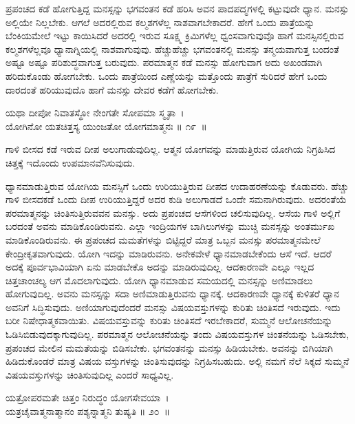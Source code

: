 ಪ್ರಪಂಚದ ಕಡೆ ಹೋಗುತ್ತಿದ್ದ ಮನಸ್ಸನ್ನು ಭಗವಂತನ ಕಡೆ ಹರಿಸಿ ಅವನ ಪಾದಪದ್ಮಗಳಲ್ಲಿ ಕಟ್ಟುವುದೇ ಧ್ಯಾನ. ಮನಸ್ಸು ಅಲ್ಲಿಯೇ ನಿಲ್ಲಬೇಕು. ಆಗಲೆ ಅದರಲ್ಲಿರುವ ಕಲ್ಮಶಗಳೆಲ್ಲ ನಾಶವಾಗಬೇಕಾದರೆ. ಹೇಗೆ ಒಂದು ಪಾತ್ರೆಯನ್ನು ಬೆಂಕಿಯಮೇಲೆ ಇಟ್ಟು ಕಾಯಿಸಿದರೆ ಅದರಲ್ಲಿ ಇರುವ ಸೂಕ್ಷ್ಮ ಕ್ರಿಮಿಗಳೆಲ್ಲ ಧ್ವಂಸವಾಗುವುವೊ ಹಾಗೆ ಮನಸ್ಸಿನಲ್ಲಿರುವ ಕಲ್ಮಶಗಳೆಲ್ಲವೂ ಧ್ಯಾನಾಗ್ನಿಯಲ್ಲಿ ನಾಶವಾಗುವುವು. ಹೆಚ್ಚುಹೆಚ್ಚು ಭಗವಂತನಲ್ಲಿ ಮನಸ್ಸು ತನ್ಮಯವಾಗುತ್ತ ಬಂದಂತೆ ಅಷ್ಟೂ ಅಷ್ಟೂ ಪರಿಶುದ್ಧವಾಗುತ್ತ ಬರುವುದು. ಪರಮಾತ್ಮನ ಕಡೆ ಮನಸ್ಸು ಹೋಗುವಾಗ ಅದು ಅಖಂಡವಾಗಿ ಹರಿದುಕೊಂಡು ಹೋಗಬೇಕು. ಒಂದು ಪಾತ್ರೆಯಿಂದ ಎಣ್ಣೆಯನ್ನು ಮತ್ತೊಂದು ಪಾತ್ರೆಗೆ ಸುರಿದರೆ ಹೇಗೆ ಒಂದು ದಾರದಂತೆ ಹರಿಯುವುದೊ ಹಾಗೆ ಮನಸ್ಸು ದೇವರ ಕಡೆಗೆ ಹೋಗಬೇಕು.

\begin{shloka}
ಯಥಾ ದೀಪೋ ನಿವಾತಸ್ಥೋ ನೇಂಗತೇ ಸೋಪಮಾ ಸ್ಮೃತಾ~।\\ಯೋಗಿನೋ ಯತಚಿತ್ತಸ್ಯ ಯುಂಜತೋ ಯೋಗಮಾತ್ಮನಃ \hfill॥ ೧೯~॥
\end{shloka}

\begin{artha}
ಗಾಳಿ ಬೀಸದ ಕಡೆ ಇರುವ ದೀಪ ಅಲುಗಾಡುವುದಿಲ್ಲ. ಆತ್ಮನ ಯೋಗವನ್ನು ಮಾಡುತ್ತಿರುವ ಯೋಗಿಯ ನಿಗ್ರಹಿಸಿದ ಚಿತ್ತಕ್ಕೆ ಇದೊಂದು ಉಪಮಾನವೆನಿಸುವುದು.
\end{artha}

ಧ್ಯಾನಮಾಡುತ್ತಿರುವ ಯೋಗಿಯ ಮನಸ್ಸಿಗೆ ಒಂದು ಉರಿಯುತ್ತಿರುವ ದೀಪದ ಉದಾಹರಣೆಯನ್ನು ಕೊಡುವರು. ಹೆಚ್ಚು ಗಾಳಿ ಬೀಸದಕಡೆ ಒಂದು ದೀಪ ಉರಿಯುತ್ತಿದ್ದರೆ ಅದರ ಕುಡಿ ಅಲುಗಾಡದೆ ಒಂದೇ ಸಮನಾಗಿರುವುದು. ಅದರಂತೆಯೆ ಪರಮಾತ್ಮನನ್ನು ಚಿಂತಿಸುತ್ತಿರುವವನ ಮನಸ್ಸು. ಅದು ಪ್ರಪಂಚದ ಆಸೆಗಳಿಂದ ಚಲಿಸುವುದಿಲ್ಲ. ಆಸೆಯ ಗಾಳಿ ಅಲ್ಲಿಗೆ ಬರದಂತೆ ಅವನು ಮಾಡಿಕೊಂಡಿರುವನು. ಎಲ್ಲಾ ಇಂದ್ರಿಯಗಳ ಬಾಗಿಲುಗಳನ್ನು ಮುಚ್ಚಿ ಮನಸ್ಸನ್ನು ಅಂತರ್ಮುಖ ಮಾಡಿಕೊಂಡಿರುವನು. ಈ ಪ್ರಪಂಚದ ಮಮತೆಗಳನ್ನು ಬಿಟ್ಟಿದ್ದರೆ ಮಾತ್ರ ಒಬ್ಬನ ಮನಸ್ಸು ಪರಮಾತ್ಮನಮೇಲೆ ಕೇಂದ್ರೀಕೃತವಾಗುವುದು. ಯೋಗಿ ಇದನ್ನು ಮಾಡಿರುವನು. ಅನೇಕವೇಳೆ ಧ್ಯಾನಮಾಡಬೇಕೆಂದು ಆಸೆ ಇದೆ. ಆದರೆ ಅದಕ್ಕೆ ಪೂರ್ವಭಾವಿಯಾಗಿ ಏನು ಮಾಡಬೇಕೊ ಅದನ್ನು ಮಾಡಿರುವುದಿಲ್ಲ. ಆದಕಾರಣವೇ ಎಲ್ಲೂ ಇಲ್ಲದ ಚಿತ್ತಚಾಂಚಲ್ಯ ಆಗ ಮೊದಲಾಗುವುದು. ಯೋಗಿ ಧ್ಯಾನಮಾಡುವ ಸಮಯದಲ್ಲಿ ಮನಸ್ಸನ್ನು ಅಣಿಮಾಡಲು ಹೋಗುವುದಿಲ್ಲ. ಅವನು ಮನಸ್ಸನ್ನು ಸದಾ ಅಣಿಮಾಡುತ್ತಿರುವನು ಧ್ಯಾನಕ್ಕೆ. ಆದಕಾರಣವೇ ಧ್ಯಾನಕ್ಕೆ ಕುಳಿತರೆ ಧ್ಯಾನ ಅವನಿಗೆ ಸಿದ್ಧಿಸುವುದು. ಅಣಿಯಾಗುವುದೆಂದರೆ ಮನಸ್ಸು ವಿಷಯವಸ್ತುಗಳನ್ನು ಕುರಿತು ಚಿಂತಿಸದೆ ಇರುವುದು. ಇದು ಬರೀ ನಿಷೇಧಾತ್ಮಕವಾಯಿತು. ವಿಷಯವಸ್ತುವನ್ನು ಕುರಿತು ಚಿಂತಿಸದೆ ಇರಬೇಕಾದರೆ, ಸುಮ್ಮನೆ ಆಲೋಚನೆಯನ್ನು ಓಡಿಸಿಬಿಡುವುದಕ್ಕಾಗುವುದಿಲ್ಲ. ಪರಮಾತ್ಮನ ಆಲೋಚನೆಯನ್ನು ತಂದು ವಿಷಯವಸ್ತುಗಳ ಚಿಂತನೆಯನ್ನು ಓಡಿಸಬೇಕು, ಪ್ರಪಂಚದ ಮೇಲಿನ ಮಮತೆಯನ್ನು ಬಿಡಿಸಬೇಕು. ಭಗವಂತನನ್ನು ಮನಸ್ಸು ಹಿಡಿಯಬೇಕು. ಅವನನ್ನು ಬಿಗಿಯಾಗಿ ಹಿಡಿದುಕೊಂಡರೆ ಮಾತ್ರ ವಿಷಯ ವಸ್ತುಗಳನ್ನು ಚಿಂತಿಸುವುದನ್ನು ನಿಗ್ರಹಿಸಬಹುದು. ಅಲ್ಲಿ ನಮಗೆ ನೆಲೆ ಸಿಕ್ಕದೆ ಸುಮ್ಮನೆ ವಿಷಯವಸ್ತುಗಳನ್ನು ಚಿಂತಿಸುವುದಿಲ್ಲ ಎಂದರೆ ಸಾಧ್ಯವಿಲ್ಲ.

\begin{shloka}
ಯತ್ರೋಪರಮತೇ ಚಿತ್ತಂ ನಿರುದ್ಧಂ ಯೋಗಸೇವಯಾ~।\\ಯತ್ರಚೈವಾತ್ಮನಾತ್ಮಾನಂ ಪಶ್ಯನ್ನಾತ್ಮನಿ ತುಷ್ಯತಿ \hfill॥ ೨೦~॥
\end{shloka}

